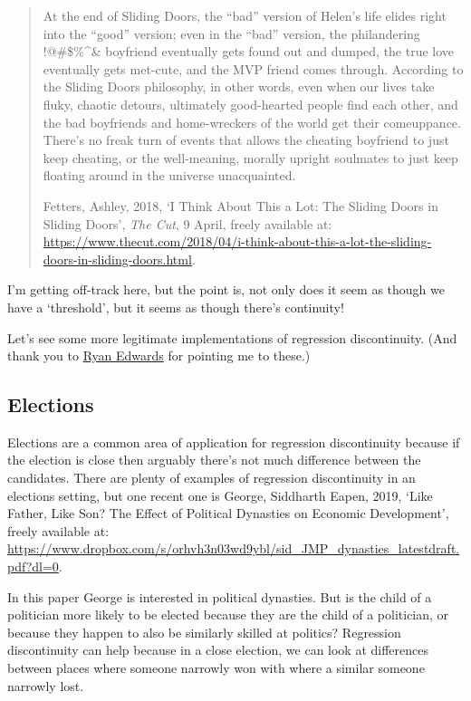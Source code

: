 \documentclass[
]{book}
\begin{document}
\begin{quote}
At the end of Sliding Doors, the ``bad'' version of Helen's life elides right into the ``good'' version; even in the ``bad'' version, the philandering !@\#\$\%\^{}\& boyfriend eventually gets found out and dumped, the true love eventually gets met-cute, and the MVP friend comes through. According to the Sliding Doors philosophy, in other words, even when our lives take fluky, chaotic detours, ultimately good-hearted people find each other, and the bad boyfriends and home-wreckers of the world get their comeuppance. There's no freak turn of events that allows the cheating boyfriend to just keep cheating, or the well-meaning, morally upright soulmates to just keep floating around in the universe unacquainted.

Fetters, Ashley, 2018, `I Think About This a Lot: The Sliding Doors in Sliding Doors', \emph{The Cut}, 9 April, freely available at: \url{https://www.thecut.com/2018/04/i-think-about-this-a-lot-the-sliding-doors-in-sliding-doors.html}.
\end{quote}

I'm getting off-track here, but the point is, not only does it seem as though we have a `threshold', but it seems as though there's continuity!

Let's see some more legitimate implementations of regression discontinuity. (And thank you to \href{http://www.ryanbedwards.com/}{Ryan Edwards} for pointing me to these.)

\hypertarget{elections}{%
\subsection{Elections}\label{elections}}

Elections are a common area of application for regression discontinuity because if the election is close then arguably there's not much difference between the candidates. There are plenty of examples of regression discontinuity in an elections setting, but one recent one is George, Siddharth Eapen, 2019, `Like Father, Like Son? The Effect of Political Dynasties on Economic Development', freely available at: \url{https://www.dropbox.com/s/orhvh3n03wd9ybl/sid_JMP_dynasties_latestdraft.pdf?dl=0}.

In this paper George is interested in political dynasties. But is the child of a politician more likely to be elected because they are the child of a politician, or because they happen to also be similarly skilled at politics? Regression discontinuity can help because in a close election, we can look at differences between places where someone narrowly won with where a similar someone narrowly lost.
\end{document}
